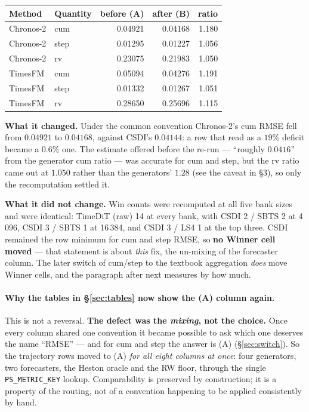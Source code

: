 \documentclass[11pt,a4paper]{article}
\begin{document}
\begin{center}\small
\begin{tabular}{llrrr}
\hline
Method & Quantity & before (A) & after (B) & ratio \\
\hline

Chronos-2 & cum & 0.04921 & 0.04168 & 1.180 \\

Chronos-2 & step & 0.01295 & 0.01227 & 1.056 \\

Chronos-2 & rv & 0.23075 & 0.21983 & 1.050 \\

TimesFM & cum & 0.05094 & 0.04276 & 1.191 \\

TimesFM & step & 0.01332 & 0.01267 & 1.051 \\

TimesFM & rv & 0.28650 & 0.25696 & 1.115 \\

\hline
\end{tabular}
\end{center}


\textbf{What it changed.} Under the common convention Chronos-2's cum RMSE fell
from $0.04921$ to $0.04168$, against CSDI's $0.04144$: a row that read as a
$19\%$ deficit became a $0.6\%$ one. The estimate offered before the re-run ---
``roughly $0.0416$'' from the generator cum ratio --- was accurate for cum and
step, but the rv ratio came out at $1.050$ rather than the generators' $1.28$
(see the caveat in \S3), so only the recomputation settled it.

\textbf{What it did not change.} Win counts were recomputed at all five bank
sizes and were identical: TimeDiT (raw) 14 at every bank, with CSDI 2 / SBTS 2 at
4\,096, CSDI 3 / SBTS 1 at 16\,384, and CSDI 3 / LS4 1 at the top three. CSDI
remained the row minimum for cum and step RMSE, so \textbf{no Winner cell moved}
--- that statement is about \emph{this} fix, the un-mixing of the forecaster
column. The later switch of cum/step to the textbook aggregation \emph{does} move
Winner cells, and the paragraph after next measures by how much.

\paragraph{Why the tables in \S\ref{sec:tables} now show the (A) column again.}
This is not a reversal. \textbf{The defect was the \emph{mixing}, not the
choice.} Once every column shared one convention it became possible to ask which
one deserves the name ``RMSE'' --- and for cum and step the answer is (A)
(\S\ref{sec:switch}). So the trajectory rows moved to (A) \emph{for all eight
columns at once}: four generators, two forecasters, the Heston oracle and the RW
floor, through the single \texttt{PS\_METRIC\_KEY} lookup. Comparability is
preserved by construction; it is a property of the routing, not of a convention
happening to be applied consistently by hand.
\end{document}
